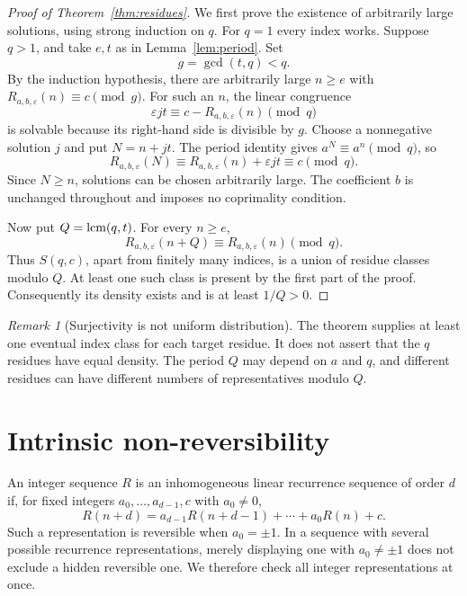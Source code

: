 \documentclass[11pt,a4paper]{article}
\theoremstyle{definition}\newtheorem{definition}[theorem]{Definition}
\theoremstyle{remark}\newtheorem{remark}[theorem]{Remark}
\begin{document}
\begin{proof}[Proof of Theorem~\ref{thm:residues}]
We first prove the existence of arbitrarily large solutions, using
strong induction on $q$. For $q=1$ every index works. Suppose $q>1$,
and take $e,t$ as in Lemma~\ref{lem:period}. Set
\[
 g=\gcd(t,q)<q.
\]
By the induction hypothesis, there are arbitrarily large $n\ge e$
with $R_{a,b,\varepsilon}(n)\equiv c\pmod g$. For such an $n$, the
linear congruence
\begin{equation}\label{eq:jcong}
 \varepsilon jt\equiv c-R_{a,b,\varepsilon}(n)\pmod q
\end{equation}
is solvable because its right-hand side is divisible by $g$.
Choose a nonnegative solution $j$ and put $N=n+jt$. The period
identity gives $a^N\equiv a^n\pmod q$, so
\[
 R_{a,b,\varepsilon}(N)
 \equiv R_{a,b,\varepsilon}(n)+\varepsilon jt
 \equiv c\pmod q.
\]
Since $N\ge n$, solutions can be chosen arbitrarily large. The
coefficient $b$ is unchanged throughout and imposes no coprimality
condition.

Now put $Q=\operatorname{lcm}(q,t)$. For every $n\ge e$,
\[
 R_{a,b,\varepsilon}(n+Q)
 \equiv R_{a,b,\varepsilon}(n)\pmod q.
\]
Thus $S(q,c)$, apart from finitely many indices, is a union of residue
classes modulo $Q$. At least one such class is present by the first
part of the proof. Consequently its density exists and is at least
$1/Q>0$.
\end{proof}

\begin{remark}[Surjectivity is not uniform distribution]
The theorem supplies at least one eventual index class for each target
residue. It does not assert that the $q$ residues have equal density.
The period $Q$ may depend on $a$ and $q$, and different residues can
have different numbers of representatives modulo $Q$.
\end{remark}

\section{Intrinsic non-reversibility}
An integer sequence $R$ is an inhomogeneous linear recurrence sequence
of order $d$ if, for fixed integers $a_0,\ldots,a_{d-1},c$ with
$a_0\ne0$,
\[
 R(n+d)=a_{d-1}R(n+d-1)+\cdots+a_0R(n)+c.
\]
Such a representation is reversible when $a_0=\pm1$. In a sequence
with several possible recurrence representations, merely displaying
one with $a_0\ne\pm1$ does not exclude a hidden reversible one. We
therefore check all integer representations at once.
\end{document}
